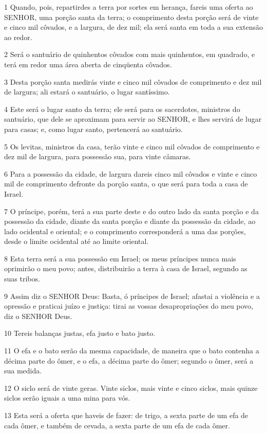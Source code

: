 \par 1 Quando, pois, repartirdes a terra por sortes em herança, fareis uma oferta ao SENHOR, uma porção santa da terra; o comprimento desta porção será de vinte e cinco mil côvados, e a largura, de dez mil; ela será santa em toda a sua extensão ao redor.
\par 2 Será o santuário de quinhentos côvados com mais quinhentos, em quadrado, e terá em redor uma área aberta de cinqüenta côvados.
\par 3 Desta porção santa medirás vinte e cinco mil côvados de comprimento e dez mil de largura; ali estará o santuário, o lugar santíssimo.
\par 4 Este será o lugar santo da terra; ele será para os sacerdotes, ministros do santuário, que dele se aproximam para servir ao SENHOR, e lhes servirá de lugar para casas; e, como lugar santo, pertencerá ao santuário.
\par 5 Os levitas, ministros da casa, terão vinte e cinco mil côvados de comprimento e dez mil de largura, para possessão sua, para vinte câmaras.
\par 6 Para a possessão da cidade, de largura dareis cinco mil côvados e vinte e cinco mil de comprimento defronte da porção santa, o que será para toda a casa de Israel.
\par 7 O príncipe, porém, terá a sua parte deste e do outro lado da santa porção e da possessão da cidade, diante da santa porção e diante da possessão da cidade, ao lado ocidental e oriental; e o comprimento corresponderá a uma das porções, desde o limite ocidental até ao limite oriental.
\par 8 Esta terra será a sua possessão em Israel; os meus príncipes nunca mais oprimirão o meu povo; antes, distribuirão a terra à casa de Israel, segundo as suas tribos.
\par 9 Assim diz o SENHOR Deus: Basta, ó príncipes de Israel; afastai a violência e a opressão e praticai juízo e justiça: tirai as vossas desapropriações do meu povo, diz o SENHOR Deus.
\par 10 Tereis balanças justas, efa justo e bato justo.
\par 11 O efa e o bato serão da mesma capacidade, de maneira que o bato contenha a décima parte do ômer, e o efa, a décima parte do ômer; segundo o ômer, será a sua medida.
\par 12 O siclo será de vinte geras. Vinte siclos, mais vinte e cinco siclos, mais quinze siclos serão iguais a uma mina para vós.
\par 13 Esta será a oferta que haveis de fazer: de trigo, a sexta parte de um efa de cada ômer, e também de cevada, a sexta parte de um efa de cada ômer.
